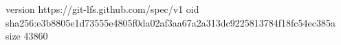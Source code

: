 version https://git-lfs.github.com/spec/v1
oid sha256:e3b8805e1d73555e4805f0da02af3aa67a2a313dc9225813784f18fc54ec385a
size 43860
